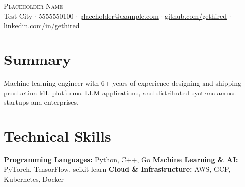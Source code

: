 \documentclass[letterpaper,11pt]{article}
\begin{document}
\begin{center}
{\Huge \scshape Placeholder Name} \\ \vspace{5pt}
\small Test City $\cdot$ 5555550100 $\cdot$ \href{mailto:placeholder@example.com}{placeholder@example.com} $\cdot$ \href{https://github.com/gethired}{github.com/gethired} $\cdot$ \href{https://linkedin.com/in/gethired}{linkedin.com/in/gethired}
\end{center}

\section{Summary}
{\small Machine learning engineer with 6+ years of experience designing and shipping production ML platforms, LLM applications, and distributed systems across startups and enterprises.}

\section{Technical Skills}
\begin{itemize}[leftmargin=0.15in, label={}, parsep=0pt, topsep=0pt, itemsep=0pt]
    \small{\item{
     \textbf{Programming Languages:} Python, C++, Go
     \textbf{Machine Learning \& AI:} PyTorch, TensorFlow, scikit-learn
     \textbf{Cloud \& Infrastructure:} AWS, GCP, Kubernetes, Docker
    }}
\end{itemize}
\end{document}
